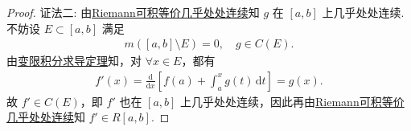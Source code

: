 \documentclass[../../main.tex]{subfiles}%
\begin{document}
\begin{proof}
{\color{blue}证法二:} 由\hyperref[Real Analysis-theorem:Riemann可积的充要条件-Riemann可积等价几乎处处连续]{Riemann可积等价几乎处处连续}知 $g$ 在 $[a,b]$ 上几乎处处连续. 不妨设 $E\subset[a,b]$ 满足
\begin{align*}
m([a,b]\setminus E)=0,\quad g\in C(E).
\end{align*}
由\hyperref[theorem:变限积分求导定理]{变限积分求导定理}知，对 $\forall x\in E$，都有
\begin{align*}
f'(x)=\frac{\mathrm{d}}{\mathrm{d}x}\left[f(a)+\int_a^x g(t)\,\mathrm{d}t\right]=g(x).
\end{align*}
故 $f'\in C(E)$，即 $f'$ 也在 $[a,b]$ 上几乎处处连续，因此再由\hyperref[theorem:Riemann可积的充要条件-Riemann可积等价几乎处处连续]{Riemann可积等价几乎处处连续}知 $f'\in R[a,b]$.
\end{proof}
\end{document}
